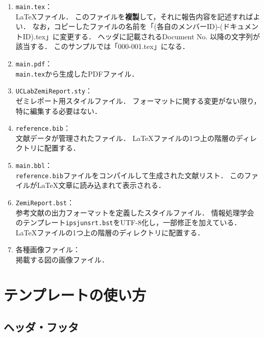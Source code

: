 \documentclass[uplatex]{jsarticle}
\begin{document}
\begin{enumerate}
\item \texttt{main.tex}：\\
\LaTeX ファイル．
このファイルを\textbf{複製}して，それに報告内容を記述すればよい．
なお，コピーしたファイルの名前を「(各自のメンバーID)-(ドキュメントID).tex」に変更する．
ヘッダに記載されるDocument No. 以降の文字列が該当する．
このサンプルでは「000-001.tex」になる．
%
\item \texttt{main.pdf}：\\
\texttt{main.tex}から生成したPDFファイル．
%
\item \texttt{UCLabZemiReport.sty}：\\
ゼミレポート用スタイルファイル．
フォーマットに関する変更がない限り，特に編集する必要はない．
%
\item \texttt{reference.bib}：\\
文献データが管理されたファイル．
\LaTeX ファイルの1つ上の階層のディレクトリに配置する．
%
\item \texttt{main.bbl}：\\
\texttt{reference.bib}ファイルをコンパイルして生成された文献リスト．
このファイルが\LaTeX 文章に読み込まれて表示される．
%
\item \texttt{ZemiReport.bst}：\\
参考文献の出力フォーマットを定義したスタイルファイル．
情報処理学会のテンプレート\texttt{ipsjunsrt.bst}をUTF-8化し，一部修正を加えている．
\LaTeX ファイルの1つ上の階層のディレクトリに配置する．
\item 各種画像ファイル：\\
掲載する図の画像ファイル．
\end{enumerate}


\section{テンプレートの使い方}

\subsection{ヘッダ・フッタ}
\end{document}
